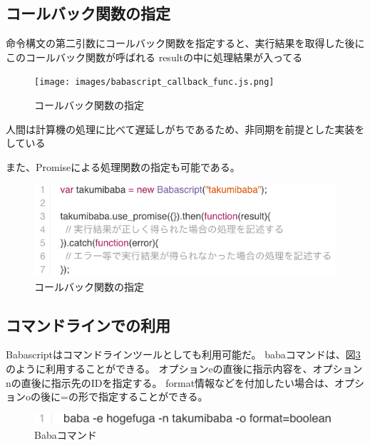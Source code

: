 \subsection{コールバック関数の指定}\label{ux30b3ux30fcux30ebux30d0ux30c3ux30afux95a2ux6570ux306eux6307ux5b9a}

命令構文の第二引数にコールバック関数を指定すると、実行結果を取得した後にこのコールバック関数が呼ばれる
resultの中に処理結果が入ってる

\begin{figure}[htbp]
  \begin{center}
  \texttt{[image: images/babascript\_callback\_func.js.png]}
  \end{center}
  \caption{コールバック関数の指定}
  \label{fig:babascript_callback_func}
\end{figure}

人間は計算機の処理に比べて遅延しがちであるため、非同期を前提とした実装をしている

また、Promiseによる処理関数の指定も可能である。

\begin{figure}[htbp]
  \begin{center}
  \includegraphics[width=.5\linewidth,bb=0 0 574 513]{images/babascript_promise.js.png}
  \end{center}
  \caption{コールバック関数の指定}
  \label{fig:babascript_promise}
\end{figure}

\subsection{コマンドラインでの利用}\label{ux30b3ux30deux30f3ux30c9ux30e9ux30a4ux30f3ux3067ux306eux5229ux7528}

Babascriptはコマンドラインツールとしても利用可能だ。
babaコマンドは、図\ref{fig:baba_command}のように利用することができる。
オプションeの直後に指示内容を、オプションnの直後に指示先のIDを指定する。
format情報などを付加したい場合は、オプションoの後に=の形で指定することができる。

\begin{figure}[htbp]
  \begin{center}
  \includegraphics[width=.6\linewidth,bb=0 0 465 17]{images/baba_command.sh.png}
  \end{center}
  \caption{Babaコマンド}
  \label{fig:baba_command}
\end{figure}

